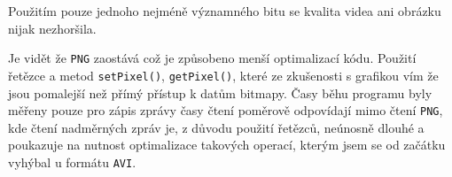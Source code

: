\documentclass[12pt]{article}
\begin{document}
Použitím pouze jednoho nejméně významného bitu se kvalita videa ani obrázku nijak nezhoršila. 

Je vidět že \texttt{PNG} zaostává což je způsobeno menší optimalizací kódu. Použití řetězce a metod \texttt{setPixel()}, \texttt{getPixel()}, které ze zkušenosti s grafikou vím že jsou pomalejší než přímý přístup k datům bitmapy. Časy běhu programu byly měřeny pouze pro zápis zprávy časy čtení poměrově odpovídají mimo čtení \texttt{PNG}, kde čtení nadměrných zpráv je, z důvodu použití řetězců, neúnosně dlouhé a poukazuje na nutnost optimalizace takových operací, kterým jsem se od začátku vyhýbal u formátu \texttt{AVI}.

\vspace{0.5cm}
\end{document}
